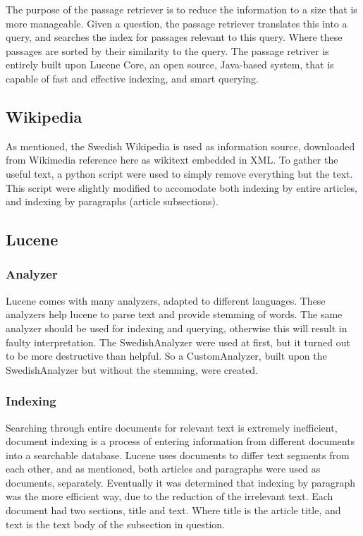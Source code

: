 The purpose of the passage retriever is to reduce the information to a size that is more manageable.
Given a question, the passage retriever translates this into a query, and searches the index for passages 
relevant to this query. Where these passages are sorted by their similarity to the query.
The passage retriver is entirely built upon Lucene Core, an open source, Java-based system, 
that is capable of fast and effective indexing, and smart querying.

\subsection{Wikipedia}
As mentioned, the Swedish Wikipedia is used as information source, downloaded from Wikimedia {reference here} as wikitext embedded in XML.
To gather the useful text, a python script were used to simply remove everything but the text. 
This script were slightly modified to accomodate both indexing by entire articles, and indexing by paragraphs (article subsections).

\subsection{Lucene}

\subsubsection{Analyzer}
Lucene comes with many analyzers, adapted to different languages. 
These analyzers help lucene to parse text and provide stemming of words.
The same analyzer should be used for indexing and querying, otherwise this will result in faulty interpretation.
The SwedishAnalyzer were used at first, but it turned out to be more destructive than helpful. 
So a CustomAnalyzer, built upon the SwedishAnalyzer but without the stemming, were created.

\subsubsection{Indexing}
Searching through entire documents for relevant text is extremely inefficient, 
document indexing is a process of entering information from different documents into a searchable database. 
Lucene uses documents to differ text segments from each other, and as mentioned, both articles and paragraphs were used as documents, separately.
Eventually it was determined that indexing by paragraph was the more efficient way, due to the reduction of the irrelevant text.
Each document had two sections, title and text. Where title is the article title, and text is the text body of the subsection in question.


